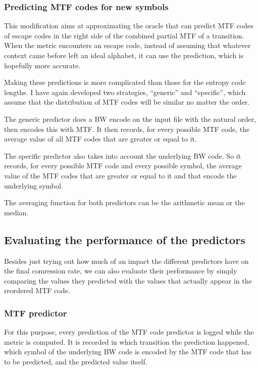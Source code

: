 \documentclass[a4paper]{scrreprt}
\begin{document}
\subsubsection{Predicting MTF codes for new symbols}

This modification aims at approximating the oracle that can predict MTF codes of
escape codes in the right side of the combined partial MTF of a transition. When
the metric encounters an escape code, instead of assuming that whatever
context came before left an ideal alphabet, it can use the prediction, which is
hopefully more accurate.

Making these predictions is more complicated than those for the entropy code
lengths. I have again developed two strategies, ``generic'' and ``specific'',
which assume that the distribution of MTF codes will be similar no matter the
order.

The generic predictor does a BW encode on the input file with the natural order,
then encodes this with MTF. It then records, for every possible MTF code, the
average value of all MTF codes that are greater or equal to it.

The specific predictor also takes into account the underlying BW code. So it
records, for every possible MTF code and every possible symbol, the average
value of the MTF codes that are greater or equal to it and that encode the
underlying symbol.

The averaging function for both predictors can be the arithmetic mean or the
median.

\subsection{Evaluating the performance of the predictors}

Besides just trying out how much of an impact the different predictors have on
the final comression rate, we can also evaluate their performance by simply
comparing the values they predicted with the values that actually appear in the
reordered MTF code.

\subsubsection{MTF predictor}

For this purpose, every prediction of the MTF code predictor is logged while the
metric is computed. It is recorded in which transition the prediction happened,
which symbol of the underlying BW code is encoded by the MTF code that has to be
predicted, and the predicted value itself.
\end{document}
